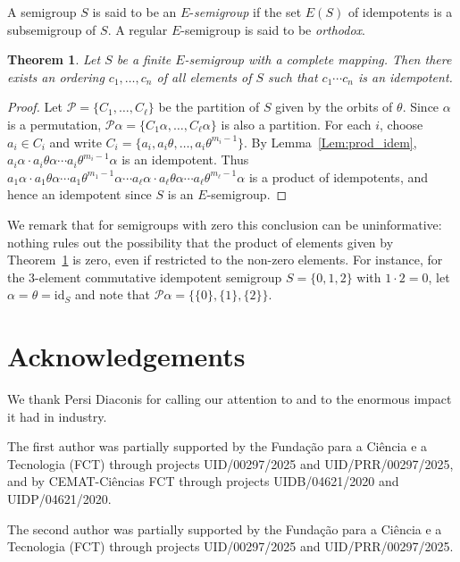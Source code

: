 \documentclass[11pt]{article}
\theoremstyle{plain}
\newtheorem{theorem}{Theorem}[section]
\theoremstyle{remark}
\theoremstyle{definition}
\theoremstyle{plain}
\newcommand{\idmap}{\mathrm{id}}
\begin{document}
A semigroup $S$ is said to be an $E$-\emph{semigroup} if the set $E(S)$ of idempotents is a subsemigroup of $S$. A regular $E$-semigroup is said to be \emph{orthodox}.

\begin{theorem}\label{Thm:E-order}
Let $S$ be a finite $E$-semigroup with a complete mapping. Then there exists an ordering $c_1,\ldots,c_n$ of all elements of $S$ such that $c_1\cdots c_n$ is an idempotent.
\end{theorem}
\begin{proof}
Let $\mathcal P=\{C_1,\ldots,C_{\ell}\}$ be the partition of $S$ given by the orbits of $\theta$. Since $\alpha$ is a permutation,
$\mathcal P\alpha=\{C_1\alpha,\ldots,C_{\ell}\alpha\}$ is also a partition. For each $i$, choose $a_i\in C_i$ and write
$C_i=\{a_i,a_i\theta,\ldots,a_i\theta^{m_i-1}\}$. By Lemma~\ref{Lem:prod_idem}, $a_i\alpha\cdot a_i\theta\alpha\cdots a_i\theta^{m_i-1}\alpha$ is an idempotent.
Thus \(a_1\alpha\cdot a_1\theta\alpha\cdots a_1\theta^{m_1-1}\alpha\cdots a_{\ell}\alpha\cdot a_{\ell}\theta\alpha\cdots a_{\ell}\theta^{m_{\ell}-1}\alpha\) is a product of idempotents, and hence an idempotent since $S$ is an $E$-semigroup.
\end{proof}

We remark that for semigroups with zero this conclusion can be uninformative: nothing rules out the possibility that the product of elements
given by Theorem~\ref{Thm:E-order} is zero, even if restricted to the non-zero elements. For instance, for the
$3$-element commutative idempotent semigroup $S=\{0,1,2\}$ with $1\cdot2=0$, let $\alpha=\theta=\idmap_S$ and note that
$\mathcal P\alpha = \{\{0\},\{1\},\{2\}\}$.

\section*{Acknowledgements}
We thank Persi Diaconis for calling our attention to \cite{Mittenthal} and to the enormous impact it had in industry. 



The first author was partially supported by the Funda\c{c}\~ao para a
Ci\^encia e a Tecnologia (FCT) through projects UID/00297/2025 and
UID/PRR/00297/2025, and by CEMAT-Ci\^{e}ncias FCT through projects
UIDB/04621/2020 and UIDP/04621/2020.

The second author was partially supported by the Funda\c{c}\~ao para a
Ci\^encia e a Tecnologia (FCT) through projects UID/00297/2025 and
UID/PRR/00297/2025.
\end{document}
